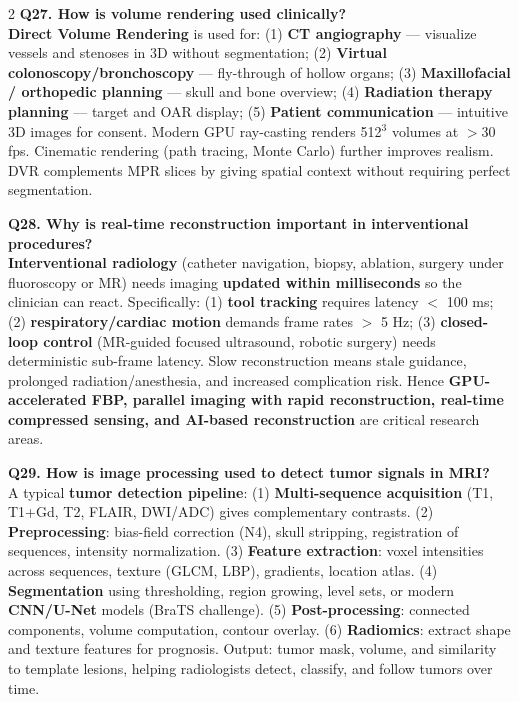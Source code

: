 \begin{paracol}{2}
\textbf{Q27. How is volume rendering used clinically?}\\
\textbf{Direct Volume Rendering} is used for: (1) \textbf{CT angiography} --- visualize vessels and stenoses in 3D without segmentation; (2) \textbf{Virtual colonoscopy/bronchoscopy} --- fly-through of hollow organs; (3) \textbf{Maxillofacial / orthopedic planning} --- skull and bone overview; (4) \textbf{Radiation therapy planning} --- target and OAR display; (5) \textbf{Patient communication} --- intuitive 3D images for consent. Modern GPU ray-casting renders 512$^3$ volumes at $>$30 fps. Cinematic rendering (path tracing, Monte Carlo) further improves realism. DVR complements MPR slices by giving spatial context without requiring perfect segmentation.

\textbf{Q28. Why is real-time reconstruction important in interventional procedures?}\\
\textbf{Interventional radiology} (catheter navigation, biopsy, ablation, surgery under fluoroscopy or MR) needs imaging \textbf{updated within milliseconds} so the clinician can react. Specifically: (1) \textbf{tool tracking} requires latency $<$ 100 ms; (2) \textbf{respiratory/cardiac motion} demands frame rates $>$ 5 Hz; (3) \textbf{closed-loop control} (MR-guided focused ultrasound, robotic surgery) needs deterministic sub-frame latency. Slow reconstruction means stale guidance, prolonged radiation/anesthesia, and increased complication risk. Hence \textbf{GPU-accelerated FBP, parallel imaging with rapid reconstruction, real-time compressed sensing, and AI-based reconstruction} are critical research areas.

\textbf{Q29. How is image processing used to detect tumor signals in MRI?}\\
A typical \textbf{tumor detection pipeline}: (1) \textbf{Multi-sequence acquisition} (T1, T1+Gd, T2, FLAIR, DWI/ADC) gives complementary contrasts. (2) \textbf{Preprocessing}: bias-field correction (N4), skull stripping, registration of sequences, intensity normalization. (3) \textbf{Feature extraction}: voxel intensities across sequences, texture (GLCM, LBP), gradients, location atlas. (4) \textbf{Segmentation} using thresholding, region growing, level sets, or modern \textbf{CNN/U-Net} models (BraTS challenge). (5) \textbf{Post-processing}: connected components, volume computation, contour overlay. (6) \textbf{Radiomics}: extract shape and texture features for prognosis. Output: tumor mask, volume, and similarity to template lesions, helping radiologists detect, classify, and follow tumors over time.


\end{paracol}
